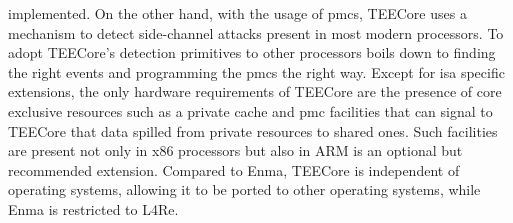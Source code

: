 implemented. On the other hand, with the usage of \glspl{pmc}, TEECore uses a
mechanism to detect side-channel attacks present in most modern processors. To
adopt TEECore's detection primitives to other processors boils down to finding
the right events and programming the \glspl{pmc} the right way. Except for
\gls{isa} specific extensions, the only hardware requirements of TEECore are the
presence of core exclusive resources such as a private cache and \gls{pmc}
facilities that can signal to TEECore that data spilled from private resources
to shared ones. Such facilities are present not only in x86 processors but also
in ARM is an optional but recommended extension. Compared to Enma, TEECore is
independent of operating systems, allowing it to be ported to other operating
systems, while Enma is restricted to L4Re.

